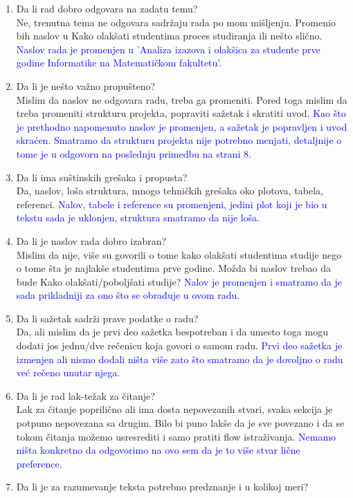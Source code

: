 \documentclass[a4paper]{report}
\newcommand{\odgovor}[1]{\textcolor{blue}{#1}}
\begin{document}
\begin{enumerate}
\item Da li rad dobro odgovara na zadatu temu?\\
Ne, trenutna tema ne odgovara sadržaju rada po mom mišljenju. Promenio bih naslov u Kako olakšati studentima proces studiranja ili nešto slično. \odgovor{Naslov rada je promenjen u 'Analiza izazova i olakšica za studente prve godine Informatike na  Matematičkom fakultetu'.}
\item Da li je nešto važno propušteno?\\
Mislim da naslov ne odgovara radu, treba ga promeniti. Pored toga mislim da treba promeniti strukturu projekta, popraviti sažetak i skratiti uvod. \odgovor{Kao što je prethodno napomenuto naslov je promenjen, a sažetak je popravljen i uvod skraćen. Smatramo da strukturu projekta nije potrebno menjati, detaljnije o tome je u odgovoru na poslednju primedbu na strani 8.}
\item Da li ima suštinskih grešaka i propusta?\\
Da, naslov, loša struktura, mnogo tehničkih grešaka oko plotova, tabela, referenci. \odgovor{Nalov, tabele i reference su promenjeni, jedini plot koji je bio u tekstu sada je uklonjen, struktura smatramo da nije loša.} 
\item Da li je naslov rada dobro izabran? \\
Mislim da nije, više su govorili o tome kako olakšati studentima studije nego o tome šta je najlakše studentima prve godine. Možda bi naslov trebao da bude Kako olakšati/poboljšati studije? \odgovor{Nalov je promenjen i smatramo da je sada prikladniji za ono što se obrađuje u ovom radu.} 
\item Da li sažetak sadrži prave podatke o radu?\\
Da, ali mislim da je prvi deo sažetka bespotreban i da umesto toga mogu dodati jos jednu/dve rečenicu koja govori o samom radu. \odgovor{Prvi deo sažetka je izmenjen ali nismo dodali ništa više zato što smatramo da je dovoljno o radu već rečeno unutar njega.} 
\item Da li je rad lak-težak za čitanje?\\
Lak za čitanje poprilično ali ima dosta nepovezanih stvari, svaka sekcija je potpuno nepovezana sa drugim. Bilo bi puno lakše da je sve povezano i da se tokom čitanja možemo usresrediti i samo pratiti flow istraživanja. \odgovor{Nemamo ništa konkretno da odgovorimo na ovo sem da je to više stvar lične preference.} 
\item Da li je za razumevanje teksta potrebno predznanje i u kolikoj meri?\\

\end{enumerate}
\end{document}
